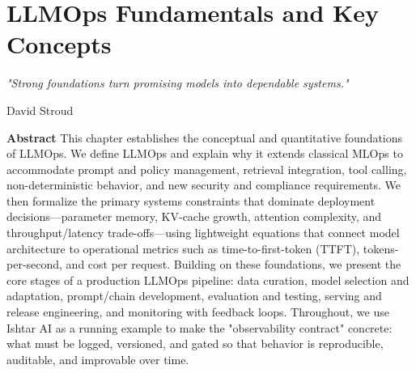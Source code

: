 \chapter{LLMOps Fundamentals and Key Concepts}
\label{ch:llmops-fundamentals}
\newrefsegment


\epigraph{\emph{"Strong foundations turn promising models into dependable systems."}}{David Stroud}

\textbf{Abstract} This chapter establishes the conceptual and quantitative foundations of LLMOps. We define LLMOps and explain why it extends classical MLOps to accommodate prompt and policy management, retrieval integration, tool calling, non-deterministic behavior, and new security and compliance requirements. We then formalize the primary systems constraints that dominate deployment decisions—parameter memory, KV-cache growth, attention complexity, and throughput/latency trade-offs—using lightweight equations that connect model architecture to operational metrics such as time-to-first-token (TTFT), tokens-per-second, and cost per request. Building on these foundations, we present the core stages of a production LLMOps pipeline: data curation, model selection and adaptation, prompt/chain development, evaluation and testing, serving and release engineering, and monitoring with feedback loops. Throughout, we use Ishtar AI as a running example to make the "observability contract" concrete: what must be logged, versioned, and gated so that behavior is reproducible, auditable, and improvable over time.

